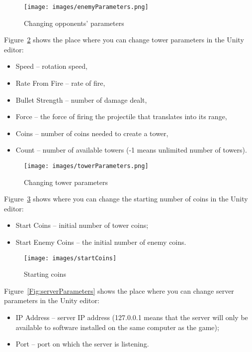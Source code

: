 \begin{figure}
\texttt{[image: images/enemyParameters.png]}
\caption{Changing opponents' parameters}
\label{Fig:enemyParameters}
\end{figure}  

Figure~\ref{Fig:towerParameters} shows the place where you can change tower parameters in the Unity editor:
\begin{itemize}
\item Speed -- rotation speed,
\item Rate From Fire -- rate of fire,
\item Bullet Strength -- number of damage dealt,
\item Force -- the force of firing the projectile that translates into its range,
\item Coins -- number of coins needed to create a tower,
\item Count -- number of available towers (-1 means unlimited number of towers).
\end{itemize}

\begin{figure}
\texttt{[image: images/towerParameters.png]}
\caption{Changing tower parameters}
\label{Fig:towerParameters}
\end{figure}  

Figure~\ref{Fig:startCoins} shows where you can change the starting number of coins in the Unity editor:
\begin{itemize}
\item Start Coins -- initial number of tower coins;
\item Start Enemy Coins -- the initial number of enemy coins.
\end{itemize}


\begin{figure}
\texttt{[image: images/startCoins]}
\caption{Starting coins}
\label{Fig:startCoins}
\end{figure} 

Figure~\ref{Fig:serverParameters} shows the place where you can change server parameters in the Unity editor:
\begin{itemize}
\item IP Address -- server IP address (127.0.0.1 means that the server will only be available to software installed on the same computer as the game);
\item Port -- port on which the server is listening.
\end{itemize}

